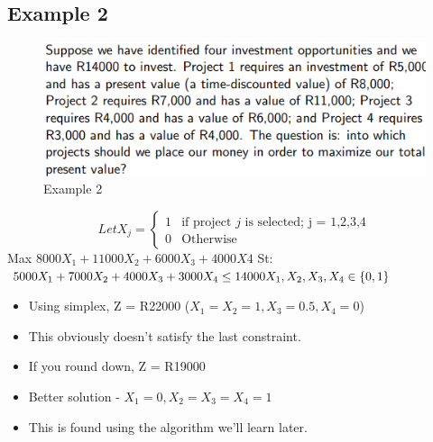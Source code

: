 \documentclass[12pt, a4paper]{article}
\begin{document}
\subsection*{Example 2}
\begin{figure}[ht]
    \centering
    \includegraphics*[width=1\textwidth]{example2}
    \caption{Example 2}
    \label{fig: Example 2}
\end{figure}

\begin{equation}
   Let X_j =
  \begin{cases}
    1 & \text{if project $j$ is selected; j = 1,2,3,4} \\
    0 & \text{Otherwise}
  \end{cases}
\end{equation}
Max $8000X_1+11000X_2+6000X_3+4000X4$
St:
$5000X_1+7000X_2+4000X_3+3000X_4 \leq 14000\\
X_1, X_2, X_3, X_4 \in \{0,1\} 
$
\begin{itemize}
    \item Using simplex, Z = R22000 ($X_1=X_2=1, X_3=0.5, X_4=0$)
    \item This obviously doesn't satisfy the last constraint.
    \item If you round down, Z = R19000
    \item Better solution - $X_1=0, X_2=X_3=X_4=1$
    \item This is found using the algorithm we'll learn later.
\end{itemize}
\end{document}

